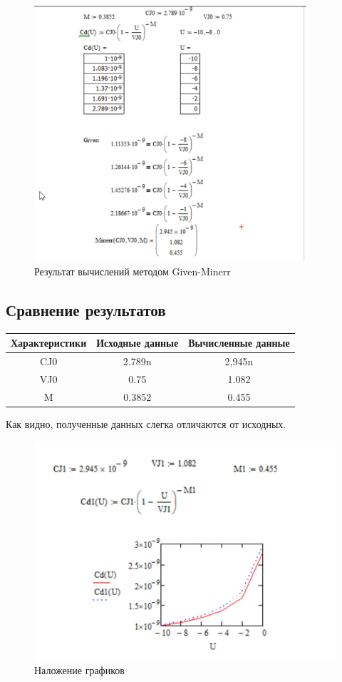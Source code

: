 \begin{figure}[H]
	\centering
	\includegraphics[width=0.9\textwidth]{img/10.jpg}
	\captionsetup{font=footnotesize}
	\caption{Результат вычислений методом Given-Minerr}
	\label{fig:10}
\end{figure}

\subsection{Сравнение результатов}

\begin{tabular}{|c|c|c|}
	\hline
	Характеристики & Исходные данные &  Вычисленные данные \\
	\hline
	CJ0 & 2.789n & 2,945n \\
	\hline
	VJ0 &0.75& 1.082 \\
	\hline
	M & 0.3852& 0.455 \\
	\hline
\end{tabular}
\newline
\newline
Как видно, полученные данных слегка отличаются от исходных.

\begin{figure}[H]
	\centering
	\includegraphics[width=1\textwidth]{img/11.jpg}
	\captionsetup{font=footnotesize}
	\caption{Наложение графиков}
	\label{fig:11}
\end{figure}